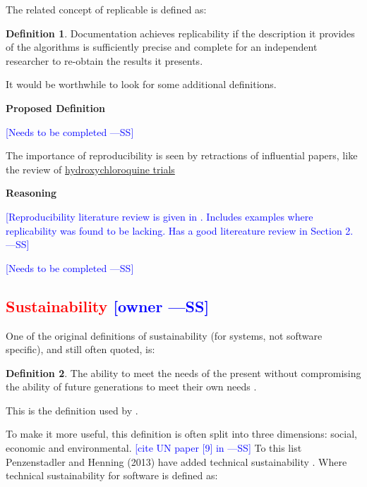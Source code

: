 \documentclass[letterpaper, cleveref]{lipics-v2019}
\newcommand{\authornote}[3]{\textcolor{#1}{[#3 ---#2]}}
\newcommand{\authornote}[3]{}
\newcommand{\wss}[1]{\authornote{blue}{SS}{#1}} %
\newcommand{\notdone}[1]{\textcolor{red}{#1}}
\theoremstyle{definition}
\newtheorem{defn}{Definition}
\begin{document}
The related concept of replicable is defined as:

\begin{defn}
  Documentation achieves replicability if the description it provides of the
  algorithms is sufficiently precise and complete for an independent researcher
  to re-obtain the results it presents.  \citep{BenureauAndRougier2017}
\end{defn}

It would be worthwhile to look for some additional definitions.

\noindent \textbf{Proposed Definition} 

\wss{Needs to be completed}

The importance of reproducibility is seen by retractions of influential
papers, like the review of \href{https://www.theguardian
.com/commentisfree/2020/jun/05/lancet-had-to-do-one-of-the-biggest
-retractions-in-modern-history-how-could-this-happen} {hydroxychloroquine
trials}

\noindent \textbf{Reasoning}

\wss{Reproducibility literature review is given in \citet{FeinbergEtAl2020}.
Includes examples where replicability was found to be lacking.  Has a good
litereature review in Section 2.}

\wss{Needs to be completed}


\subsection{\notdone{Sustainability} \wss{owner}}

One of the original definitions of sustainability (for systems, not software
specific), and still often quoted, is:

\begin{defn}
  \noindent The ability to meet the needs of the present without
  compromising the ability of future generations to meet their own needs
  \citep{Brundtland1987}.
\end{defn}

This is the definition used by \citet{IISD2019}.

To make it more useful, this definition is often split into three dimensions:
social, economic and environmental. \wss{cite UN paper [9] in
  \citet{PenzenstadlerAndHenning2013}} To this list Penzenstadler and Henning
(2013) have added technical sustainability \citep{PenzenstadlerAndHenning2013}.
Where technical sustainability for software is defined as:
\end{document}
